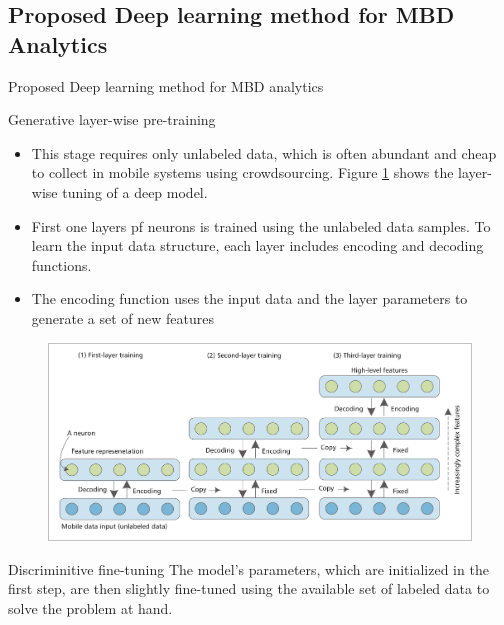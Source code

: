 \documentclass[newPxFont]{beamer}
\begin{document}
\subsection{Proposed Deep learning method for MBD Analytics}
\begin{frame}[c, allowframebreaks]{Proposed Deep learning method for MBD analytics}
	\begin{block}{Generative layer-wise pre-training}
    
      \begin{itemize}
			\item{This stage requires only
unlabeled data, which is often abundant and cheap to collect
in mobile systems using crowdsourcing. Figure \ref{fig:training} shows the
layer-wise tuning of a deep model.}

			\item{First one layers pf neurons is trained using the unlabeled data samples. To learn the input data structure, each layer includes encoding and decoding functions.}
            
            \vspace{1em}
            
            \item{The encoding function uses the input data and the layer parameters to generate a set of new features}
            
            
      \end{itemize}
    \end{block}
    
    \vspace{5em}
    
    \begin{figure}
		\centering
		\includegraphics[width=1\linewidth]{resources/deep_learning.png}
        \label{fig:training}
	\end{figure}
    
    \vspace{2em}
    
    \begin{block}{Discriminitive fine-tuning}
    	The model’s parameters, which
are initialized in the first step, are then slightly fine-tuned
using the available set of labeled data to solve the problem at
hand.
    \end{block}

\end{frame}
\end{document}
